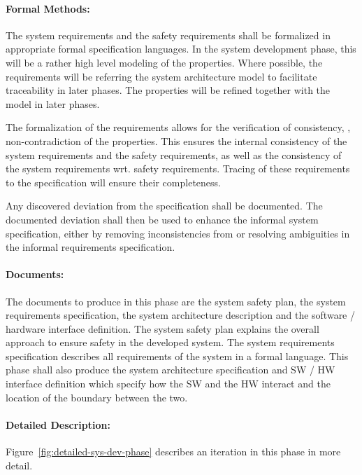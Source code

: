 \paragraph{Formal Methods:}
\label{sec:sys-dev-formal-methods}
The system requirements and the safety requirements shall be formalized in
appropriate formal specification languages. In the system development phase,
this will be a rather high level modeling of the properties. Where possible, the
requirements will be referring the system architecture model to facilitate
traceability in later phases. The properties will be refined together with the
model in later phases.

The formalization of the requirements allows for the verification of
consistency, \eg, non-contradiction of the properties. This ensures the internal
consistency of the system requirements and the safety requirements, as well as
the consistency of the system requirements wrt. safety requirements. Tracing of
these requirements to the specification will ensure their completeness.

Any discovered deviation from the specification shall be documented. The
documented deviation shall then be used to enhance the informal system
specification, either by removing inconsistencies from or resolving ambiguities
in the informal requirements specification.

\paragraph{Documents:}
\label{sec:sys-dev-documents}
The documents to produce in this phase are the system safety plan, the system
requirements specification, the system architecture description and the software
/ hardware interface definition. The system safety plan explains the overall
approach to ensure safety in the developed system. The system requirements
specification describes all requirements of the system in a formal
language. This phase shall also produce the system architecture specification
and SW / HW interface definition which specify how the SW and the HW interact
and the location of the boundary between the two.


\paragraph{Detailed Description:}
\label{sec:sys-dev-deta-descr}
Figure~\ref{fig:detailed-sys-dev-phase} describes an iteration in this phase in
more detail.

